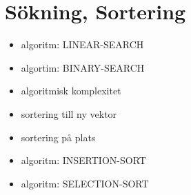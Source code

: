 \chapter{Sökning, Sortering}\label{chapter:W10}
\begin{itemize}[nosep]
\item algoritm: LINEAR-SEARCH
\item algortim: BINARY-SEARCH
\item algoritmisk komplexitet
\item sortering till ny vektor
\item sortering på plats
\item algoritm: INSERTION-SORT
\item algoritm: SELECTION-SORT
\end{itemize}